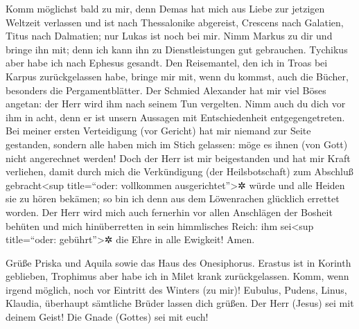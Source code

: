  Komm möglichst bald zu mir,  denn Demas
hat mich aus Liebe zur jetzigen Weltzeit verlassen und ist nach
Thessalonike abgereist, Crescens nach Galatien, Titus nach Dalmatien;
 nur Lukas ist noch bei mir. Nimm Markus zu dir und
bringe ihn mit; denn ich kann ihn zu Dienstleistungen gut gebrauchen.
 Tychikus aber habe ich nach Ephesus gesandt.
 Den Reisemantel, den ich in Troas bei Karpus
zurückgelassen habe, bringe mir mit, wenn du kommst, auch die Bücher,
besonders die Pergamentblätter.  Der Schmied Alexander
hat mir viel Böses angetan: der Herr wird ihm nach seinem Tun vergelten.
 Nimm auch du dich vor ihm in acht, denn er ist unsern
Aussagen mit Entschiedenheit entgegengetreten.  Bei
meiner ersten Verteidigung (vor Gericht) hat mir niemand zur Seite
gestanden, sondern alle haben mich im Stich gelassen: möge es ihnen (von
Gott) nicht angerechnet werden!  Doch der Herr ist mir
beigestanden und hat mir Kraft verliehen, damit durch mich die
Verkündigung (der Heilsbotschaft) zum Abschluß gebracht\textless sup
title=``oder: vollkommen ausgerichtet''\textgreater✲ würde und alle
Heiden sie zu hören bekämen; so bin ich denn aus dem Löwenrachen
glücklich errettet worden.  Der Herr wird mich auch
fernerhin vor allen Anschlägen der Bosheit behüten und mich
hinüberretten in sein himmlisches Reich: ihm sei\textless sup
title=``oder: gebührt''\textgreater✲ die Ehre in alle Ewigkeit! Amen.

 Grüße Priska und Aquila sowie das Haus des Onesiphorus.
 Erastus ist in Korinth geblieben, Trophimus aber habe
ich in Milet krank zurückgelassen.  Komm, wenn irgend
möglich, noch vor Eintritt des Winters (zu mir)! Eubulus, Pudens, Linus,
Klaudia, überhaupt sämtliche Brüder lassen dich grüßen. 
Der Herr (Jesus) sei mit deinem Geist! Die Gnade (Gottes) sei mit euch!
